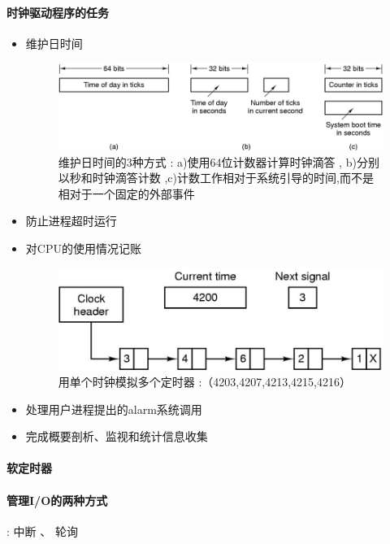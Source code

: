 \documentclass[UTF8,a4paper]{ctexart}
\begin{document}
\paragraph{时钟驱动程序的任务}
\begin{itemize}
	\item 维护日时间
	\begin{figure}[H]
		\centering
		\includegraphics[scale = 0.3]{assets/ModernOperatingSystems/2018-01-10-19-38-22.png}
		\caption{维护日时间的3种方式 : a)使用64位计数器计算时钟滴答 , b)分别以秒和时钟滴答计数 ,c)计数工作相对于系统引导的时间,而不是相对于一个固定的外部事件}
	\end{figure}
	
	\item 防止进程超时运行
	\item 对CPU的使用情况记账
	\begin{figure}[H]
		\centering
		\includegraphics[scale = 0.3]{assets/ModernOperatingSystems/2018-01-10-19-41-23.png}
		\caption{用单个时钟模拟多个定时器 :（4203,4207,4213,4215,4216）}
	\end{figure}
	
	\item 处理用户进程提出的alarm系统调用
	\item 完成概要剖析、监视和统计信息收集
\end{itemize}

\paragraph{软定时器}
\paragraph{管理I/O的两种方式} : 中断 、 轮询
\end{document}
